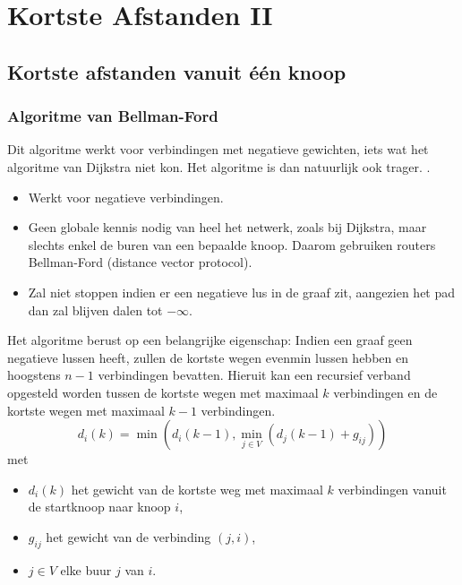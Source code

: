 \documentclass{report}
\begin{document}
\chapter{Kortste Afstanden II}
\section{Kortste afstanden vanuit één knoop}
\subsection{Algoritme van Bellman-Ford}
Dit algoritme werkt voor verbindingen met negatieve gewichten, iets wat het algoritme van Dijkstra niet kon. Het algoritme is dan natuurlijk ook trager. .

\begin{itemize}
	\item [\good] Werkt voor negatieve verbindingen.
	\item [\good] Geen globale kennis nodig van heel het netwerk, zoals bij Dijkstra, maar slechts enkel de buren van een bepaalde knoop. Daarom gebruiken routers Bellman-Ford (distance vector protocol).
	\item [\alert] Zal niet stoppen indien er een negatieve lus in de graaf zit, aangezien het pad dan zal blijven dalen tot $-\infty$. 
\end{itemize}

Het algoritme berust op een belangrijke eigenschap: Indien een graaf geen negatieve lussen heeft, zullen de kortste wegen evenmin lussen hebben en hoogstens $n - 1$ verbindingen bevatten. Hieruit kan een recursief verband opgesteld worden tussen de kortste wegen met maximaal $k$ verbindingen en de kortste wegen met maximaal $k - 1$ verbindingen.
$$d_i(k) = \min(d_i(k - 1), \min\limits_{j \in V} (d_j(k - 1) + g_{ij}))$$
met
\begin{itemize}
	\item $d_i(k)$ het gewicht van de kortste weg met maximaal $k$ verbindingen vanuit de startknoop naar knoop $i$,
	\item $g_{ij}$ het gewicht van de verbinding $(j, i)$,
	\item $j \in V$ elke buur $j$ van $i$.
\end{itemize}
\end{document}
